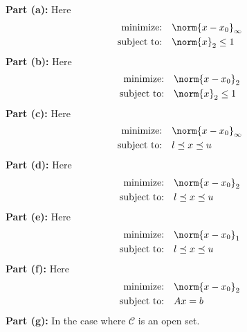 \documentclass[11pt]{article}
\begin{document}
\begin{homeworkProblem}
    \textbf{Part (a):} Here
    \begin{align*}
        \text{minimize:} \quad   & \norm{x - x_0}_\infty \\
        \text{subject to:} \quad & \norm{x}_2 \leq 1
    \end{align*}
    \textbf{Part (b):} Here
    \begin{align*}
        \text{minimize:} \quad   & \norm{x - x_0}_2  \\
        \text{subject to:} \quad & \norm{x}_2 \leq 1
    \end{align*}
    \textbf{Part (c):} Here
    \begin{align*}
        \text{minimize:} \quad   & \norm{x - x_0}_\infty \\
        \text{subject to:} \quad & l \preceq x \preceq u
    \end{align*}
    \textbf{Part (d):} Here
    \begin{align*}
        \text{minimize:} \quad   & \norm{x - x_0}_2      \\
        \text{subject to:} \quad & l \preceq x \preceq u
    \end{align*}
    \textbf{Part (e):} Here
    \begin{align*}
        \text{minimize:} \quad   & \norm{x - x_0}_1      \\
        \text{subject to:} \quad & l \preceq x \preceq u
    \end{align*}
    \textbf{Part (f):} Here
    \begin{align*}
        \text{minimize:} \quad   & \norm{x - x_0}_2 \\
        \text{subject to:} \quad & Ax = b
    \end{align*}
    \textbf{Part (g):} In the case where $\mathcal{C}$ is an open set.

\end{homeworkProblem}

\pagebreak
\end{document}
